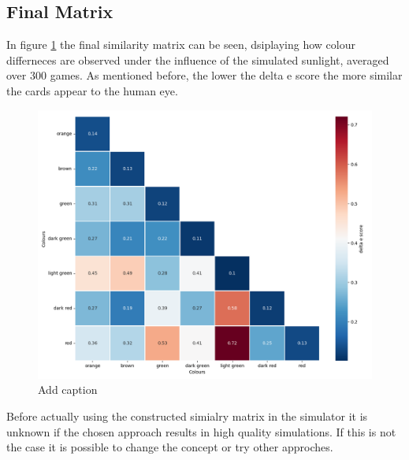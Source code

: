 \subsection{Final Matrix}
In figure \ref{fig:simMatrix} the final similarity matrix can be seen, dsiplaying how colour differneces are observed under the influence of the simulated sunlight, averaged over 300 games. As mentioned before, the lower the delta e score the more similar the cards appear to the human eye. 
\begin{figure}[H]
	\centering
	\includegraphics[width=15cm]{images/simMatrix.png}
	\caption[Bild kurz]{Add caption}
	\label{fig:simMatrix}
\end{figure}

Before actually using the constructed simialry matrix in the simulator it is unknown if the chosen approach results in high quality simulations. If this is not the case it is possible to change the concept or try other approches. 

